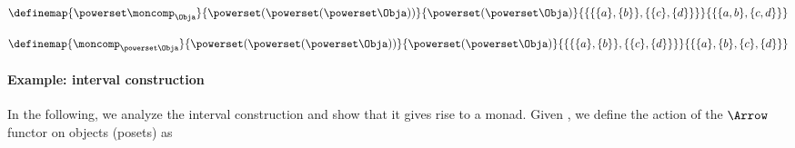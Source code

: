 \begin{equation}
    \label{eq:monad-power-power-moncomp}
    \definemap{
        \powerset \moncomp_{\Obja}
    }{
        \powerset (\powerset (\powerset\Obja))
    }{
        \powerset (\powerset \Obja)
    }{
        \{  \{   \{a\}, \{b\} \} , \{ \{c\}, \{d\} \}\}
    }{
        \{  \{ a, b \}, \{ c, d \} \}
    }
\end{equation}

\begin{equation}
    \label{eq:monad-power-moncomp-power}
    \definemap{
        \moncomp_{\powerset \Obja}
    }{
        \powerset (\powerset (\powerset\Obja))
    }{
        \powerset (\powerset \Obja)
    }{
        \{  \{   \{a\}, \{b\} \} , \{ \{c\}, \{d\} \}\}
    }{
        \{    \{a\}, \{b\}  ,  \{c\}, \{d\}  \}
    }
\end{equation}
%

\paragraph*{Example: interval construction}
In the following, we analyze the interval construction and show that it gives rise to a monad.
Given \Pos, we define the action of the $\Arrow$ functor on objects (posets) as

